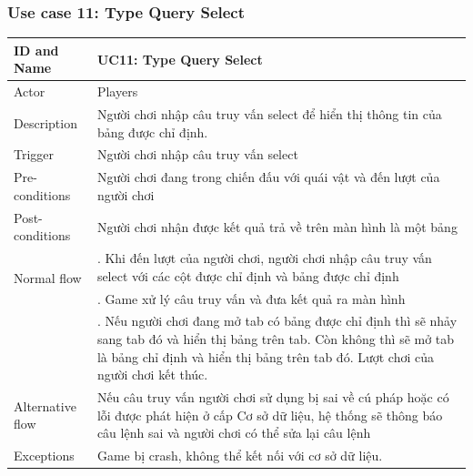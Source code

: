 \subsubsection{Use case 11: Type Query Select}
\begin{center}
	\begin{tabular}{|l|p{12cm}|}
		\hline
		ID and Name & UC11: Type Query Select \\
		\hline
		Actor  & Players \\
		\hline
		Description  & Người chơi nhập câu truy vấn select để hiển thị thông tin của bảng được chỉ định.\\
		\hline
		Trigger  & Người chơi nhập câu truy vấn select\\
		\hline
		Pre-conditions & Người chơi đang trong chiến đấu với quái vật và đến lượt của người chơi\\
		\hline
		Post-conditions & Người chơi nhận được kết quả trả về trên màn hình là một bảng\\
		\hline
		\multirow{2}{*}{Normal flow}      &\qquad 1. Khi đến lượt của người chơi, người chơi nhập câu truy vấn select với các cột được chỉ định và bảng được chỉ định\\
		&\qquad 2. Game xử lý câu truy vấn và đưa kết quả ra màn hình\\
		&\qquad 3. Nếu người chơi đang mở tab có bảng được chỉ định thì sẽ nhảy sang tab đó và hiển thị bảng trên tab. Còn không thì sẽ mở tab là bảng chỉ định và hiển thị bảng trên tab đó. Lượt chơi của người chơi kết thúc.\\
		\hline
		Alternative flow  & Nếu câu truy vấn người chơi sử dụng bị sai về cú pháp hoặc có lỗi được phát hiện ở cấp Cơ sở dữ liệu, hệ thống sẽ thông báo câu lệnh sai và người chơi có thể sửa lại câu lệnh\\
		\hline
		Exceptions  & Game bị crash, không thể kết nối với cơ sở dữ liệu.\\
		\hline
	\end{tabular}
\end{center}

